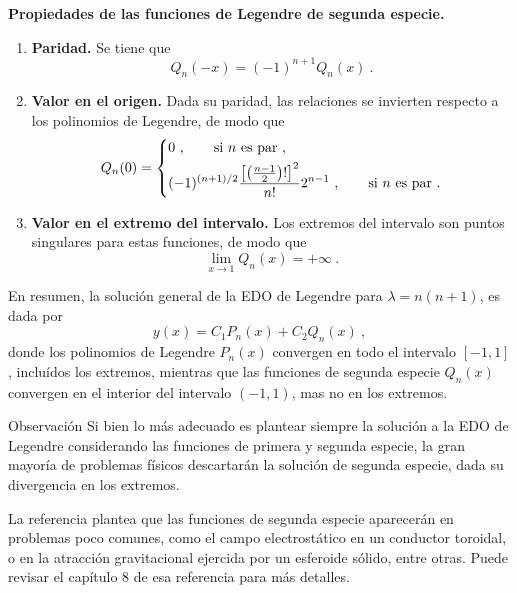 \begin{propiedad}
    \textbf{Propiedades de las funciones de Legendre de segunda especie.}

    \begin{enumerate}
        \item \textbf{Paridad.} Se tiene que
        \begin{equation}
            Q_n(-x) = (-1)^{n+1} Q_n(x) \ .
        \end{equation}
        \item \textbf{Valor en el origen.} Dada su paridad, las relaciones se invierten respecto a los polinomios de Legendre, de modo que
        \begin{equation}
            Q_n(0) = \begin{dcases}
                0 \ , \qquad \text{si } n \text{ es par} \ , \\
                (-1)^{(n+1)/2} \frac{\left[ \left( \frac{n-1}{2} \right)! \right]^2}{n!} 2^{n-1} \ , \qquad \text{si } n \text{ es par} \ .  
            \end{dcases}
        \end{equation}
        \item \textbf{Valor en el extremo del intervalo.} Los extremos del intervalo son puntos singulares para estas funciones, de modo que
        \begin{equation}
            \lim_{x \to 1} Q_n(x) = +\infty \ .
        \end{equation}
    \end{enumerate} 
\end{propiedad}



En resumen, la solución general de la EDO de Legendre para $\lambda = n(n+1)$, es dada por
\begin{equation}
    y(x) = C_1 P_n(x) + C_2 Q_n(x) \ ,
\end{equation}
donde los polinomios de Legendre $P_n(x)$ convergen en todo el intervalo $[-1,1]$, incluídos los extremos, mientras que las funciones de segunda especie $Q_n(x)$ convergen en el interior del intervalo $(-1,1)$, mas no en los extremos.

\begin{obs}{Observación}
    Si bien lo más adecuado es plantear siempre la solución a la EDO de Legendre considerando las funciones de primera y segunda especie, la gran mayoría de problemas físicos descartarán la solución de segunda especie, dada su divergencia en los extremos.

    La referencia \cite{Lebedev_Silverman_1972} plantea que las funciones de segunda especie aparecerán en problemas poco comunes, como el campo electrostático en un conductor toroidal, o en la atracción gravitacional ejercida por un esferoide sólido, entre otras. Puede revisar el capítulo 8 de esa referencia para más detalles.
\end{obs}

